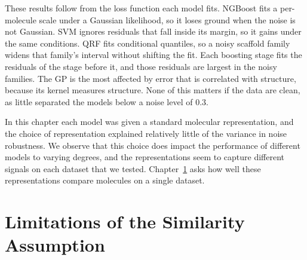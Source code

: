 These results follow from the loss function each model fits. NGBoost fits a per-molecule scale under a Gaussian likelihood, so it loses ground when the noise is not Gaussian. SVM ignores residuals that fall inside its margin, so it gains under the same conditions. QRF fits conditional quantiles, so a noisy scaffold family widens that family's interval without shifting the fit. Each boosting stage fits the residuals of the stage before it, and those residuals are largest in the noisy families. The GP is the most affected by error that is correlated with structure, because its kernel measures structure. None of this matters if the data are clean, as little separated the models below a noise level of 0.3.

In this chapter each model was given a standard molecular representation, and the choice of representation explained relatively little of the variance in noise robustness. We observe that this choice does impact the performance of different models to varying degrees, and the representations seem to capture different signals on each dataset that we tested. Chapter~\ref{chap:flaws} asks how well these representations compare molecules on a single dataset.

\chapter{Limitations of the Similarity Assumption}\label{chap:flaws}


